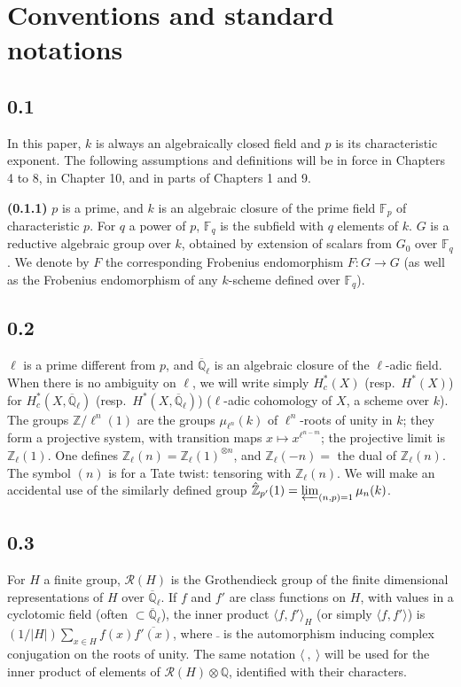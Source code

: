 \documentclass[11pt]{amsart}
\theoremstyle{plain}
\theoremstyle{remark}
\begin{document}
\section*{Conventions and standard notations}

\subsection*{0.1} In this paper, $k$ is always an algebraically closed field and $p$ is its characteristic exponent. The following assumptions and definitions will be in force in Chapters 4 to 8, in Chapter 10, and in parts of Chapters 1 and 9.

\textbf{(0.1.1)} $p$ is a prime, and $k$ is an algebraic closure of the prime field $\mathbb{F}_p$ of characteristic $p$. For $q$ a power of $p$, $\mathbb{F}_q$ is the subfield with $q$ elements of $k$. $G$ is a reductive algebraic group over $k$, obtained by extension of scalars from $G_0$ over $\mathbb{F}_q$. We denote by $F$ the corresponding Frobenius endomorphism $F: G \to G$ (as well as the Frobenius endomorphism of any $k$-scheme defined over $\mathbb{F}_q$).

\subsection*{0.2} $\ell$ is a prime different from $p$, and $\overline{\mathbb{Q}}_\ell$ is an algebraic closure of the $\ell$-adic field. When there is no ambiguity on $\ell$, we will write simply $H_c^*(X)$ (resp.\ $H^*(X)$) for $H_c^*(X, \overline{\mathbb{Q}}_\ell)$ (resp.\ $H^*(X, \overline{\mathbb{Q}}_\ell)$) ($\ell$-adic cohomology of $X$, a scheme over $k$). The groups $\mathbb{Z}/\ell^n(1)$ are the groups $\mu_{\ell^n}(k)$ of $\ell^n$-roots of unity in $k$; they form a projective system, with transition maps $x \mapsto x^{\ell^{n-m}}$; the projective limit is $\mathbb{Z}_\ell(1)$. One defines $\mathbb{Z}_\ell(n) = \mathbb{Z}_\ell(1)^{\otimes n}$, and $\mathbb{Z}_\ell(-n) =$ the dual of $\mathbb{Z}_\ell(n)$. The symbol $(n)$ is for a Tate twist: tensoring with $\mathbb{Z}_\ell(n)$. We will make an accidental use of the similarly defined group $\hat{\mathbb{Z}}_{p'}(1) = \varprojlim_{(n,p)=1} \mu_n(k)$.

\subsection*{0.3} For $H$ a finite group, $\mathcal{R}(H)$ is the Grothendieck group of the finite dimensional representations of $H$ over $\overline{\mathbb{Q}}_\ell$. If $f$ and $f'$ are class functions on $H$, with values in a cyclotomic field (often $\subset \overline{\mathbb{Q}}_\ell$), the inner product $\langle f, f' \rangle_H$ (or simply $\langle f, f' \rangle$) is $(1/|H|) \sum_{x \in H} f(x)\overline{f'(x)}$, where $\bar{\ }$ is the automorphism inducing complex conjugation on the roots of unity. The same notation $\langle \ ,\ \rangle$ will be used for the inner product of elements of $\mathcal{R}(H) \otimes \mathbb{Q}$, identified with their characters.
\end{document}
